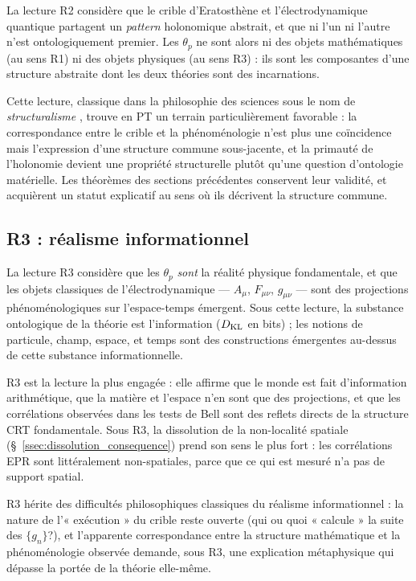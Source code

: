 La lecture R2 considère que le crible d'Eratosthène et
l'électrodynamique quantique partagent un \emph{pattern}
holonomique abstrait, et que ni l'un ni l'autre n'est
ontologiquement premier. Les $\theta_p$ ne sont alors
ni des objets mathématiques (au sens R1) ni des objets physiques
(au sens R3) : ils sont les composantes d'une structure abstraite
dont les deux théories sont des incarnations.

Cette lecture, classique dans la philosophie des sciences sous
le nom de \emph{structuralisme} \cite{Belot1998,Maudlin2011},
trouve en PT un terrain particulièrement favorable : la
correspondance entre le crible et la phénoménologie n'est plus
une coïncidence mais l'expression d'une structure commune
sous-jacente, et la primauté de l'holonomie devient une propriété
structurelle plutôt qu'une question d'ontologie matérielle. Les
théorèmes des sections précédentes conservent leur validité, et
acquièrent un statut explicatif au sens où ils décrivent la
structure commune.

\subsection{R3 : réalisme informationnel}
\label{ssec:R3}

La lecture R3 considère que les $\theta_p$ \emph{sont} la réalité
physique fondamentale, et que les objets classiques de
l'électrodynamique --- $A_\mu$, $F_{\mu\nu}$, $g_{\mu\nu}$ ---
sont des projections phénoménologiques sur l'espace-temps
émergent. Sous cette lecture, la substance ontologique de la
théorie est l'information ($D_{\mathrm{KL}}$ en bits) ; les notions de
particule, champ, espace, et temps sont des constructions
émergentes au-dessus de cette substance informationnelle.

R3 est la lecture la plus engagée : elle affirme que le monde est
fait d'information arithmétique, que la matière et l'espace n'en
sont que des projections, et que les corrélations observées dans
les tests de Bell sont des reflets directs de la structure CRT
fondamentale. Sous R3, la dissolution de la non-localité spatiale
(\S~\ref{ssec:dissolution_consequence}) prend son sens le plus
fort : les corrélations EPR sont littéralement non-spatiales,
parce que ce qui est mesuré n'a pas de support spatial.

R3 hérite des difficultés philosophiques classiques du réalisme
informationnel \cite{Healey2007} : la nature de
l'« exécution » du crible reste ouverte (qui ou quoi
« calcule » la suite des $\{g_n\}$?), et l'apparente
correspondance entre la structure mathématique et la
phénoménologie observée demande, sous R3, une explication
métaphysique qui dépasse la portée de la théorie elle-même.

